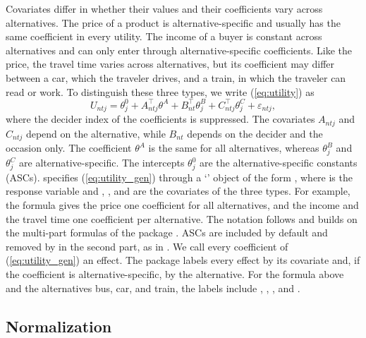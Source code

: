 \documentclass[article,shortnames]{jss}
\newcommand{\class}[1]{`\code{#1}'}
\begin{document}
Covariates differ in whether their values and their coefficients vary across
alternatives. The price of a product is alternative-specific and usually has the
same coefficient in every utility. The income of a buyer is constant across
alternatives and can only enter through alternative-specific coefficients. Like
the price, the travel time varies across alternatives, but its coefficient may
differ between a car, which the traveler drives, and a train, in which the
traveler can read or work. To distinguish these three types, we write
(\ref{eq:utility}) as
%
\begin{equation}
  \label{eq:utility_gen}
  U_{ntj} = \theta_{j}^{0} + A_{ntj}^\top \theta^{A} + B_{nt}^\top
  \theta_{j}^{B} + C_{ntj}^\top \theta_{j}^{C} + \varepsilon_{ntj},
\end{equation}
%
where the decider index of the coefficients is suppressed. The covariates
$A_{ntj}$ and $C_{ntj}$ depend on the alternative, while $B_{nt}$ depends on the
decider and the occasion only. The coefficient $\theta^{A}$ is the same for all
alternatives, whereas $\theta_{j}^{B}$ and $\theta_{j}^{C}$ are
alternative-specific. The intercepts $\theta_{j}^{0}$ are the
alternative-specific constants (ASCs).  specifies
(\ref{eq:utility_gen}) through a \class{formula} object of the form
, where  is the response variable and
, , and  are the covariates of the three types. For
example, the formula  gives the price one
coefficient for all alternatives, and the income and the travel time one
coefficient per alternative. The notation follows  and builds on the
multi-part formulas of the  package \citep{Zeileis2010}. ASCs are
included by default and removed by  in the second part, as in
. We call every coefficient of
(\ref{eq:utility_gen}) an effect. The package labels every effect by its
covariate and, if the coefficient is alternative-specific, by the alternative.
For the formula above and the alternatives bus, car, and train, the labels
include , , , and .

\subsection{Normalization} \label{sec:model:normalization}
\end{document}

